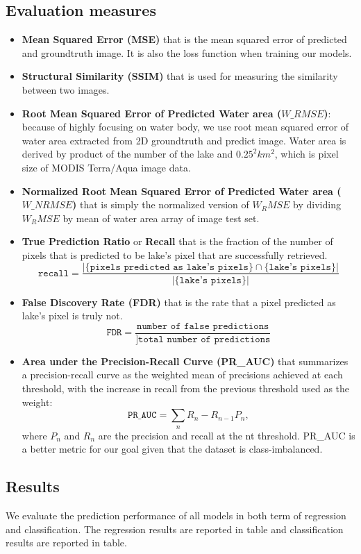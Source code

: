 \subsection{Evaluation measures}
\begin{itemize}
    \item \textbf{Mean Squared Error (MSE)} that is the mean squared error of predicted and groundtruth image. It is also the loss function when training our models.
    \item \textbf{Structural Similarity (SSIM)} that is used for measuring the similarity between two images. %
    \item \textbf{Root Mean Squared Error of Predicted Water area ($W\_RMSE$)}: because of highly focusing on water body, we use root mean squared error of water area extracted from 2D groundtruth and predict image. Water area is derived by product of the number of the lake and $0.25^2 km^2$, which is pixel size of MODIS Terra/Aqua image data.
    \item \textbf{Normalized Root Mean Squared Error of Predicted Water area ($W\_NRMSE$)} that is simply the normalized version of $W_RMSE$ by dividing $W_RMSE$ by mean of water area array of image test set.
    \item \textbf{True Prediction Ratio} or \textbf{Recall} that is the fraction of the number of pixels that is predicted to be lake's pixel that are successfully retrieved.
    \[ \texttt{recall} = \frac{|\{\texttt{pixels predicted as lake's pixels}\} \cap \{\texttt{lake's pixels}\}|}{|\{\texttt{lake's pixels}\}|} \]
    \item \textbf{False Discovery Rate (FDR)} that is the rate that a pixel predicted as lake's pixel is truly not.
    \[ \texttt{FDR} = \frac{\texttt{number of false predictions}}{]\texttt{total number of predictions}} \]
    \item \textbf{Area under the Precision-Recall Curve (PR\_AUC)} that summarizes a precision-recall curve as the weighted mean of precisions achieved at each threshold, with the increase in recall from the previous threshold used as the weight:
    \[ \texttt{PR\_AUC} = \sum_n{R_n - R_{n-1}}{P_n}, \] %
    where $P_n$ and $R_n$ are the precision and recall at the nt threshold. PR\_AUC is a better metric for our goal given that the dataset is class-imbalanced. %
\end{itemize}

\subsection{Results}
We evaluate the prediction performance of all models in both term of regression and classification. The regression results are reported in table %
and classification results are reported in table. %


